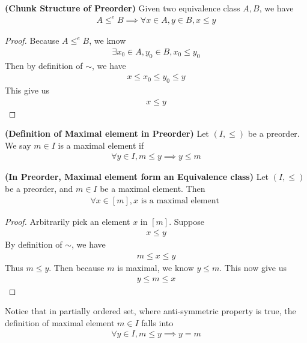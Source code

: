 \documentclass{report}
\begin{document}
\begin{corollary}
\label{1.1.3}
\textbf{(Chunk Structure of Preorder)} Given two equivalence class $A,B$, we have
 \begin{align*}
A\leq^e B \implies \forall x\in A,y \in B, x\leq y
\end{align*}
\end{corollary}
\begin{proof}
Because $A\leq ^e B$, we know 
\begin{align*}
\exists x_0\in A,y_0\in B, x_0\leq y_0
\end{align*}
Then by definition of $\sim$, we have
\begin{align*}
x \leq x_0\leq y_0\leq y
\end{align*}
This give us 
\begin{align*}
x\leq y
\end{align*}
\end{proof}
\begin{definition}
\label{1.1.4}
\textbf{(Definition of Maximal element in Preorder)} Let $(I,\leq )$ be a preorder. We say $m\in I$ is a maximal element if 
\begin{align*}
\forall y\in I, m\leq y\implies y\leq m
\end{align*}
\end{definition}
\begin{theorem}
\label{1.1.5}
\textbf{(In Preorder, Maximal element form an Equivalence class)} Let $(I,\leq )$ be a preorder, and $m \in  I$ be a maximal element. Then 
\begin{align*} 
\forall x\in [m], x\text{ is a maximal element }
\end{align*}
\end{theorem}
\begin{proof}
Arbitrarily pick an element $x$ in $[m]$. Suppose 
\begin{align*}
x\leq y 
\end{align*}
By definition of $\sim$, we have 
\begin{align*}
m\leq x\leq y
\end{align*}
Thus $m\leq y$. Then because $m$ is maximal, we know $y\leq m$. This now give us 
\begin{align*}
y\leq m\leq x
\end{align*}
\end{proof}
\begin{mdframed}
Notice that in partially ordered set, where anti-symmetric property is true, the definition of maximal element $m \in I$ falls into 
\begin{align*}
\forall y \in I, m \leq y \implies y=m
\end{align*}
\end{mdframed}
\end{document}
